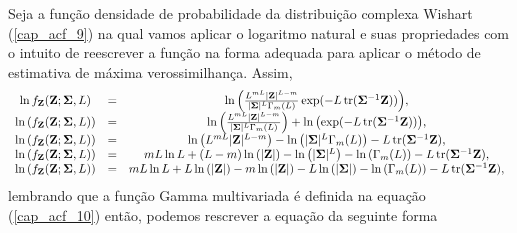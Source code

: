 Seja a função densidade de probabilidade da distribuição complexa Wishart (\ref{cap_acf_9}) na qual vamos aplicar o logaritmo natural e suas propriedades com o intuito de reescrever a função na forma adequada para aplicar o método de estimativa de máxima verossimilhança. Assim,
\begin{equation}\label{cap_acf_11}
\begin{array}{ccc}
    \ln{f_{\mathbf{Z}}(\mathbf{Z};\mathbf{\Sigma},L)}&=&\ln{\left(\frac{L^{mL}|\mathbf{Z}|^{L-m}}{|\mathbf{\Sigma}|^{L}\Gamma_m(L)} \exp(-L\operatorname{tr}(\mathbf{\Sigma}^{-1}\mathbf{Z}))\right)}, \\
        \ln{\left(f_{\mathbf{Z}}(\mathbf{Z};\mathbf{\Sigma},L)\right)}&=&\ln{\left(\frac{L^{mL}|\mathbf{Z}|^{L-m}}{|\mathbf{\Sigma}|^{L}\Gamma_m(L)}\right)}+\ln{\left( \exp(-L\operatorname{tr}(\mathbf{\Sigma}^{-1}\mathbf{Z}))\right)}, \\
        \ln{\left(f_{\mathbf{Z}}(\mathbf{Z};\mathbf{\Sigma},L)\right)}&=&\ln{\left(L^{mL}|\mathbf{Z}|^{L-m}\right)} - \ln{\left(|\mathbf{\Sigma}|^{L}\Gamma_m(L)\right)}-L\operatorname{tr}(\mathbf{\Sigma}^{-1}\mathbf{Z}), \\
        \ln{\left(f_{\mathbf{Z}}(\mathbf{Z};\mathbf{\Sigma},L)\right)}&=&mL\ln{L}+(L-m)\ln{\left(|\mathbf{Z}|\right)} - \ln{\left(|\mathbf{\Sigma}|^{L}\right)}-\ln{\left(\Gamma_m(L)\right)}-L\operatorname{tr}(\mathbf{\Sigma}^{-1}\mathbf {Z}), \\
	\ln{\left(f_{\mathbf{Z}}(\mathbf{Z};\mathbf{\Sigma},L)\right)}&=&mL\ln{L}+L\ln{\left(|\mathbf{Z}|\right)}-m\ln{\left(|\mathbf{Z}|\right)} - L\ln{\left(|\mathbf{\Sigma}|\right)}-\ln{\left(\Gamma_m(L)\right)}-L\operatorname{tr}(\mathbf{\Sigma}^{-1}\mathbf{Z}), \\
\end{array}
\end{equation}
lembrando que a função Gamma multivariada é definida na equação (\ref{cap_acf_10}) então, podemos rescrever a equação da seguinte forma
